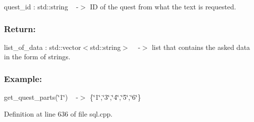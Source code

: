 quest\+\_\+id \+: std\+::string ~\newline
-\/$>$ ID of the quest from what the text is requested.~\newline


\subsubsection*{Return\+: }

list\+\_\+of\+\_\+data \+: std\+::vector$<$std\+::string$>$ ~\newline
-\/$>$ list that contains the asked data in the form of strings.~\newline


\subsubsection*{Example\+: }

get\+\_\+quest\+\_\+parts(\char`\"{}1\char`\"{}) ~\newline
-\/$>$ \{\char`\"{}1\char`\"{},\char`\"{}3\char`\"{},\char`\"{}4\char`\"{},\char`\"{}5\char`\"{},\char`\"{}6\char`\"{}\} 

Definition at line 636 of file sql.\+cpp.

